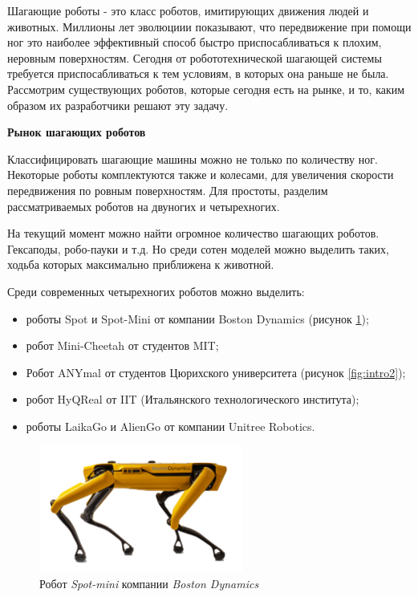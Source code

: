 
Шагающие роботы - это класс роботов, имитирующих движения людей и животных. Миллионы лет эволюциии показывают, что передвижение при помощи ног это наиболее эффективный способ быстро приспосабливаться к плохим, неровным поверхностям. Сегодня от робототехнической шагающей системы требуется приспосабливаться к тем условиям, в которых она раньше не была. Рассмотрим существующих роботов, которые сегодня есть на рынке, и то, каким образом их разработчики решают эту задачу.

\textbf{Рынок шагающих роботов}

Классифицировать шагающие машины можно не только по количеству ног. Некоторые роботы комплектуются также и колесами, для увеличения скорости передвижения по ровным поверхностям. Для простоты, разделим рассматриваемых роботов на двуногих и четырехногих. 

На текущий момент можно найти огромное количество шагающих роботов. Гексаподы, робо-пауки и т.д. Но среди сотен моделей можно выделить таких, ходьба которых максимально приближена к животной.

Среди современных четырехногих роботов можно выделить:
\begin{itemize}
    \item роботы Spot и Spot-Mini от компании Boston Dynamics (рисунок \ref{fig:intro1});
    \item робот Mini-Cheetah от студентов MIT;
    \item Робот ANYmal от студентов Цюрихского университета (рисунок \ref{fig:intro2});
    \item робот HyQReal от IIT (Итальянского технологического института);
    \item роботы LaikaGo и AlienGo от компании Unitree Robotics.
\end{itemize}

\begin{figure}[h!]
    \centering
    \includegraphics[width=0.6\textwidth]{chapter_intro/figure1.png}
    \caption{Робот \textit{Spot-mini} компании \textit{Boston Dynamics}}
    \label{fig:intro1}
\end{figure}

